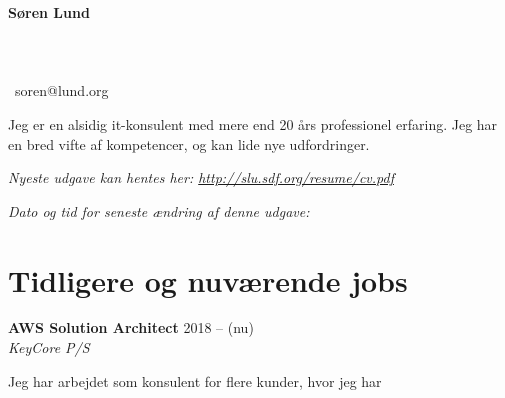 \documentclass[a4paper,11pt]{article}
\newcommand\redacted{[skjult i online version]}
\newcommand\myaddressone{\redacted}
\newcommand\myaddresstwo{\redacted}
\newcommand\myphone{\redacted}
\begin{document}
\centerline{}
\bigskip

\begin{minipage}[b]{0.30\textwidth}
  \selectfont%
  \textbf{Søren Lund} \\
  \myaddressone \\
  \myaddresstwo \\
  \myphone \\
  \Email\ soren@lund.org
\end{minipage}%
\hfill
\begin{minipage}[b]{0.30\textwidth}
  \selectfont%
  Jeg er en alsidig it-konsulent med
  mere end 20 års professionel
  erfaring. Jeg har en bred vifte af
  kompetencer, og
  kan lide nye udfordringer.
\end{minipage}

\bigskip
\centerline{\small\textit{Nyeste udgave kan hentes her: \url{http://slu.sdf.org/resume/cv.pdf}}}
\centerline{\small\textit{Dato og tid for seneste ændring af denne udgave: }}

\section*{Tidligere og nuværende jobs}

\textbf{AWS Solution Architect} \hfill 2018 -- (nu) \\
\textsl{KeyCore P/S}

Jeg har arbejdet som konsulent for flere kunder, hvor jeg har

\newcommand{\awscloudformation}{\textit{AWS CloudFormation}}
\newcommand{\awscodebuild}{\textit{AWS CodeBuild}}
\newcommand{\awscodepipeline}{\textit{AWS CodePipeline}}
\end{document}
